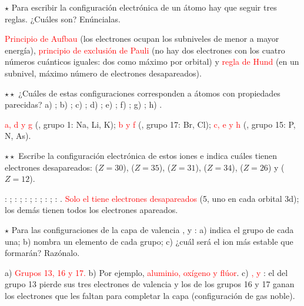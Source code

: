 \begin{exercise}
    \(\star\) Para escribir la configuración electrónica de un átomo hay que seguir tres reglas. ¿Cuáles son? Enúncialas.
    \begin{solu}
        \textcolor{red}{Principio de Aufbau} (los electrones ocupan los subniveles de menor a mayor energía),
        \textcolor{red}{principio de exclusión de Pauli} (no hay dos electrones con los cuatro números cuánticos iguales: dos como
        máximo por orbital) y \textcolor{red}{regla de Hund} (en un subnivel, máximo número de electrones desapareados).
    \end{solu}
\end{exercise}

\begin{exercise}
    \(\star\star\) ¿Cuáles de estas configuraciones corresponden a átomos con propiedades parecidas? a) ;
    b) ; c) ; d) ; e) ;
    f) ; g) ; h) .
    \begin{solu}
        \textcolor{red}{a, d y g} (, grupo 1: Na, Li, K); \textcolor{red}{b y f} (, grupo 17: Br, Cl);
        \textcolor{red}{c, e y h} (, grupo 15: P, N, As).
    \end{solu}
\end{exercise}

\begin{exercise}
    \(\star\star\) Escribe la configuración electrónica de estos iones e indica cuáles tienen electrones desapareados: 
    (\(Z = 30\)),  (\(Z = 35\)),  (\(Z = 31\)),  (\(Z = 34\)),  (\(Z = 26\)) y 
    (\(Z = 12\)).
    \begin{solu}
        : ; : ; : ;
        : ; : ; : .
        \textcolor{red}{Solo el  tiene electrones desapareados} (5, uno en cada orbital 3d); los demás tienen todos los
        electrones apareados.
    \end{solu}
\end{exercise}

\begin{exercise}
    \(\star\) Para las configuraciones de la capa de valencia ,  y : a) indica
    el grupo de cada una; b) nombra un elemento de cada grupo; c) ¿cuál será el ion más estable que formarán? Razónalo.
    \begin{solu}
        a) \textcolor{red}{Grupos 13, 16 y 17.} b) Por ejemplo, \textcolor{red}{aluminio, oxígeno y flúor}. c)
        \textcolor{red}{,  y }: el del grupo 13 pierde sus tres electrones de valencia y los de los grupos
        16 y 17 ganan los electrones que les faltan para completar la capa (configuración de gas noble).
    \end{solu}
\end{exercise}

